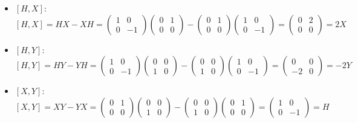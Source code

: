 \documentclass{article}
\begin{document}
\begin{itemize}
    \item \([H, X]\):
    \[
    [H, X] = HX - XH = \begin{pmatrix} 1 & 0 \\ 0 & -1 \end{pmatrix}\begin{pmatrix} 0 & 1 \\ 0 & 0 \end{pmatrix} - \begin{pmatrix} 0 & 1 \\ 0 & 0 \end{pmatrix}\begin{pmatrix} 1 & 0 \\ 0 & -1 \end{pmatrix} = \begin{pmatrix} 0 & 2 \\ 0 & 0 \end{pmatrix} = 2X
    \]
    
    \item \([H, Y]\):
    \[
    [H, Y] = HY - YH = \begin{pmatrix} 1 & 0 \\ 0 & -1 \end{pmatrix}\begin{pmatrix} 0 & 0 \\ 1 & 0 \end{pmatrix} - \begin{pmatrix} 0 & 0 \\ 1 & 0 \end{pmatrix}\begin{pmatrix} 1 & 0 \\ 0 & -1 \end{pmatrix} = \begin{pmatrix} 0 & 0 \\ -2 & 0 \end{pmatrix} = -2Y
    \]
    
    \item \([X, Y]\):
    \[
    [X, Y] = XY - YX = \begin{pmatrix} 0 & 1 \\ 0 & 0 \end{pmatrix}\begin{pmatrix} 0 & 0 \\ 1 & 0 \end{pmatrix} - \begin{pmatrix} 0 & 0 \\ 1 & 0 \end{pmatrix}\begin{pmatrix} 0 & 1 \\ 0 & 0 \end{pmatrix} = \begin{pmatrix} 1 & 0 \\ 0 & -1 \end{pmatrix} = H
    \]


\end{itemize}
\end{document}
